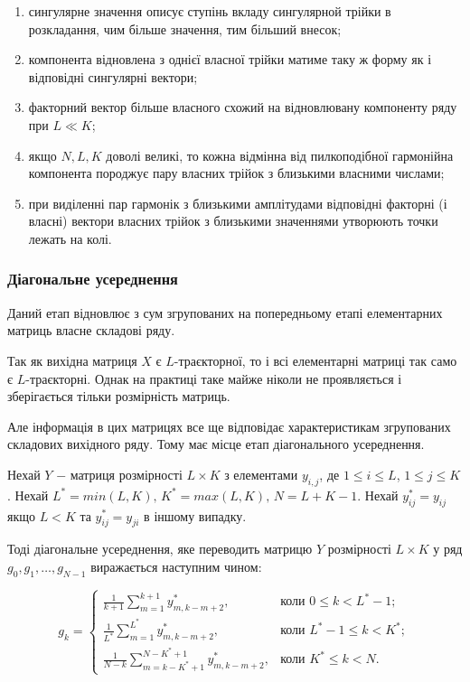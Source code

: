 \begin{enumerate}
	\item сингулярне значення описує ступінь вкладу сингулярной трійки в розкладання, чим більше значення, тим більший внесок;
	\item компонента відновлена з однієї власної трійки матиме таку ж форму як і відповідні сингулярні вектори;
	\item факторний вектор більше власного схожий на відновлювану компоненту ряду при $L \ll K$;
	\item якщо $N, L, K$ доволі великі, то кожна відмінна від пилкоподібної гармонійна компонента породжує пару власних трійок з близькими власними числами;
	\item при виділенні пар гармонік з близькими амплітудами відповідні факторні (і власні) вектори власних трійок з близькими значеннями утворюють точки лежать на колі.
\end{enumerate}

\subsubsection{Діагональне усереднення}

Даний етап відновлює з сум згрупованих на попередньому етапі елементарних матриць власне складові ряду.

Так як вихідна матриця $X$ є $L$-траєкторної, то і всі елементарні матриці так само є $L$-траєкторні. Однак на практиці таке майже ніколи не проявляється і зберігається тільки розмірність матриць.

Але інформація в цих матрицях все ще відповідає характеристикам згрупованих складових вихідного ряду. Тому має місце етап діагонального усереднення.

Нехай $Y$ $-$ матриця розмірності $L \times K$ з елементами $y_{i,j}$, де $1 \le i \le L$, $1 \le j \le K$. Нехай $L^{*} = min(L, K), \, K^{*} = max(L,K), \, N = L + K - 1$. Нехай $y_{ij}^{*} = y_{ij}$ якщо $L < K$ та $y_{ij}^{*} = y_{ji}$ в іншому випадку.

Тоді діагональне усереднення, яке переводить матрицю $Y$ розмірності $L \times K$ у ряд $g_{0}, g_{1}, \dots, g_{N-1}$ виражається наступним чином:

\[
g_{k} = \begin{cases}
\frac{1}{k+1}\sum_{m=1}^{k+1}y_{m,k-m+2}^{*}, &\text{коли } 0 \le k < L^{*} - 1; \\
\frac{1}{L^{*}}\sum_{m=1}^{L^{*}}y_{m,k-m+2}^{*}, &\text{коли } L^{*} - 1 \le k < K^{*}; \\
\frac{1}{N-k}\sum_{m=k-K^{*}+1}^{N-K^{*}+1}y_{m,k-m+2}^{*}, &\text{коли } K^{*} \le k < N.
\end{cases}
\]

